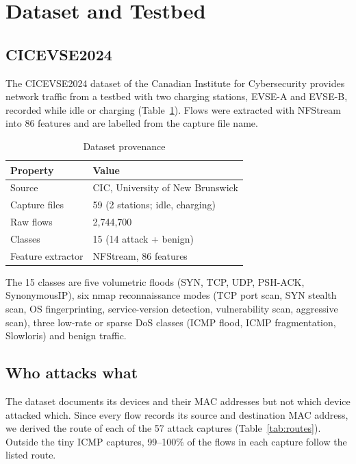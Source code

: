 \documentclass[conference]{IEEEtran}
\begin{document}
\section{Dataset and Testbed}
\label{sec:dataset}

\subsection{CICEVSE2024}

The CICEVSE2024 dataset of the Canadian Institute for Cybersecurity \cite{b8} provides network traffic from a testbed with two charging stations, EVSE-A and EVSE-B, recorded while idle or charging (Table~\ref{tab:provenance}). Flows were extracted with NFStream into 86 features and are labelled from the capture file name.

\begin{table}[!t]
\caption{Dataset provenance}
\label{tab:provenance}
\centering
\footnotesize
\begin{tabular}{@{}ll@{}}
\toprule
\textbf{Property} & \textbf{Value} \\
\midrule
Source & CIC, University of New Brunswick \\
Capture files & 59 (2 stations; idle, charging) \\
Raw flows & 2,744,700 \\
Classes & 15 (14 attack + benign) \\
Feature extractor & NFStream, 86 features \\
\bottomrule
\end{tabular}
\end{table}

The 15 classes are five volumetric floods (SYN, TCP, UDP, PSH-ACK, SynonymousIP), six nmap reconnaissance modes (TCP port scan, SYN stealth scan, OS fingerprinting, service-version detection, vulnerability scan, aggressive scan), three low-rate or sparse DoS classes (ICMP flood, ICMP fragmentation, Slowloris) and benign traffic.

\subsection{Who attacks what}
\label{sec:routes}

The dataset documents its devices and their MAC addresses but not which device attacked which. Since every flow records its source and destination MAC address, we derived the route of each of the 57 attack captures (Table~\ref{tab:routes}). Outside the tiny ICMP captures, 99--100\% of the flows in each capture follow the listed route.
\end{document}
